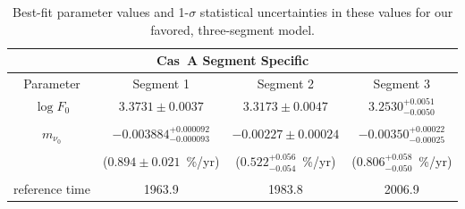 \documentclass[fleqn,usenatbib]{mnras}
\begin{document}
\begin{table*}
\caption{Best-fit parameter values and 1-$\sigma$ statistical uncertainties in these values for our favored, three-segment model.}\label{tab4}
\centering


\begin{tabular}{c c c c}
\multicolumn{4}{c}{\textbf{Cas~A Segment Specific}}\\
\hline 
\hline 
Parameter & Segment 1 & Segment 2 & Segment 3 \\
\hline 
\hline 
$\log F_0$ & $3.3731 \pm 0.0037$ & $3.3173 \pm 0.0047$ & $3.2530^{+0.0051}_{-0.0050}$ \\
\\
$m_{\nu_0}$ & $-0.003884^{+0.000092}_{-0.000093}$ & $-0.00227 \pm 0.00024$ & $-0.00350^{+0.00022}_{-0.00025}$ \\
\\
& ($0.894 \pm 0.021$~\%/yr) & ($0.522^{+0.056}_{-0.054}$~\%/yr) & ($0.806^{+0.058}_{-0.050}$~\%/yr) \\
\\
reference time & 1963.9 & 1983.8 & 2006.9 \\
\end{tabular} \\

\bigskip


\end{table*}
\end{document}
